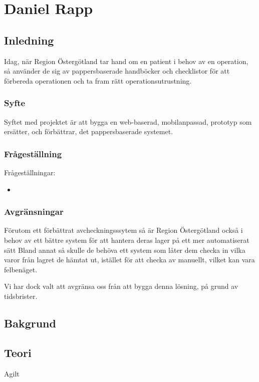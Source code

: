 \section{Daniel Rapp}
\subsection{Inledning}
Idag, när Region Östergötland tar hand om en patient i behov av en operation, så använder de sig av pappersbaserade handböcker och checklistor för att
förbereda operationen och ta fram rätt operationsutrustning.

\subsubsection{Syfte}
Syftet med projektet är att bygga en web-baserad, mobilanpassad, prototyp som ersätter, och förbättrar, det pappersbaserade systemet.


\subsubsection{Frågeställning}
Frågeställningar:
\begin{itemize}
  \item
\end{itemize}


\subsubsection{Avgränsningar}
Förutom ett förbättrat avcheckningsssytem så är Region Östergötland också i behov av
ett bättre system för att hantera deras lager på ett mer automatiserat sätt%
Bland annat
så skulle de behöva ett system som låter dem checka in vilka varor från lagret de hämtat
ut, istället för att checka av manuellt, vilket kan vara felbenäget.

Vi har dock valt att avgränsa oss från att bygga denna lösning, på grund av tidsbrister.


\subsection{Bakgrund}


\subsection{Teori}
Agilt

